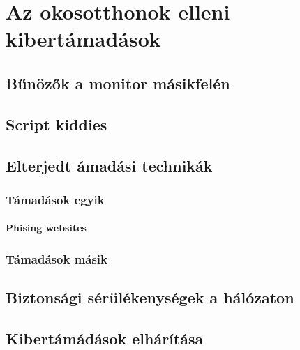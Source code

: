 \chapter{Az okosotthonok elleni kibertámadások}

\section{Bűnözők a monitor másikfelén}
\section{Script kiddies}


\section{Elterjedt ámadási technikák}

\subsection{Támadások egyik}
\subsubsection{Phising websites}




\subsection{Támadások másik}


\section{Biztonsági sérülékenységek a hálózaton}

\section{Kibertámádások elhárítása}
\subsection{}

